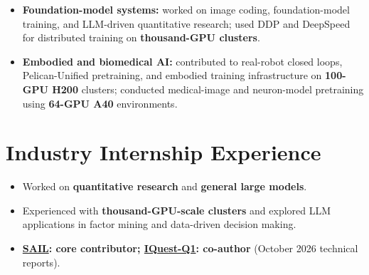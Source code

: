\documentclass{resume}
\begin{document}
\begin{samepage}
\begin{itemize}
    \item \textbf{Foundation-model systems:} worked on image coding, foundation-model training, and LLM-driven quantitative research; used DDP and DeepSpeed for distributed training on \textbf{thousand-GPU clusters}.
    \item \textbf{Embodied and biomedical AI:} contributed to real-robot closed loops, Pelican-Unified pretraining, and embodied training infrastructure on \textbf{100-GPU H200} clusters; conducted medical-image and neuron-model pretraining using \textbf{64-GPU A40} environments.
\end{itemize}
\end{samepage}

\section{\makebox[.75em][c]{\faGroup} \textbf{Industry Internship Experience}}
\begin{itemize}
    \item Worked on \textbf{quantitative research} and \textbf{general large models}.
    \item Experienced with \textbf{thousand-GPU-scale clusters} and explored LLM applications in factor mining and data-driven decision making.
    \item \textbf{\href{https://arxiv.org/abs/2610.11451}{SAIL}: core contributor; \href{https://arxiv.org/abs/2610.30949}{IQuest-Q1}: co-author} (October 2026 technical reports).
\end{itemize}
\end{document}
